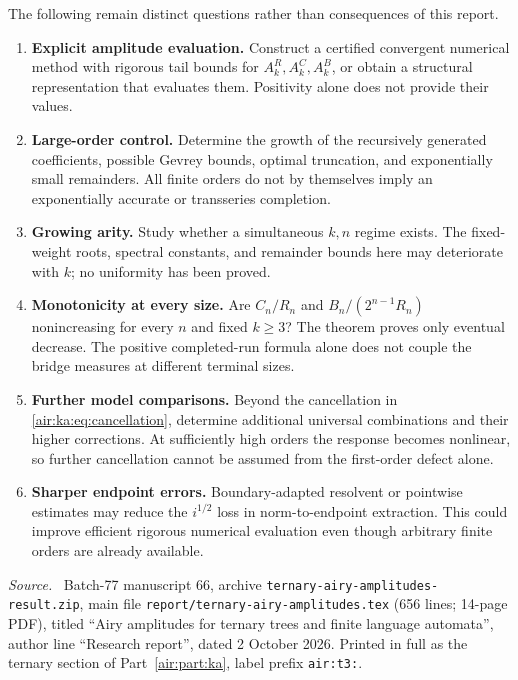 \documentclass[11pt,letterpaper]{article}
\numberwithin{equation}{section}
\theoremstyle{remark}
\newenvironment{partsource}{\par\medskip\noindent\begin{minipage}{\linewidth}\small\raggedright\textit{Source.}\ }{\end{minipage}\par\medskip}
\newcommand{\repopath}[1]{\nolinkurl{#1}}
\begin{document}
The following remain distinct questions rather than consequences of this report.
\begin{enumerate}
\item \textbf{Explicit amplitude evaluation.} Construct a certified convergent numerical method with rigorous tail bounds for $A_k^R,A_k^C,A_k^B$, or obtain a structural representation that evaluates them. Positivity alone does not provide their values.
\item \textbf{Large-order control.} Determine the growth of the recursively generated coefficients, possible Gevrey bounds, optimal truncation, and exponentially small remainders. All finite orders do not by themselves imply an exponentially accurate or transseries completion.
\item \textbf{Growing arity.} Study whether a simultaneous $k,n$ regime exists. The fixed-weight roots, spectral constants, and remainder bounds here may deteriorate with $k$; no uniformity has been proved.
\item \textbf{Monotonicity at every size.} Are $C_n/R_n$ and $B_n/(2^{n-1}R_n)$ nonincreasing for every $n$ and fixed $k\ge3$? The theorem proves only eventual decrease. The positive completed-run formula alone does not couple the bridge measures at different terminal sizes.
\item \textbf{Further model comparisons.} Beyond the cancellation in \eqref{air:ka:eq:cancellation}, determine additional universal combinations and their higher corrections. At sufficiently high orders the response becomes nonlinear, so further cancellation cannot be assumed from the first-order defect alone.
\item \textbf{Sharper endpoint errors.} Boundary-adapted resolvent or pointwise estimates may reduce the $i^{1/2}$ loss in norm-to-endpoint extraction. This could improve efficient rigorous numerical evaluation even though arbitrary finite orders are already available.
\end{enumerate}

\bigskip{}\par\nopagebreak
\begin{partsource}
Batch-77 manuscript 66, archive \repopath{ternary-airy-amplitudes-result.zip}, main file \repopath{report/ternary-airy-amplitudes.tex} (656 lines; 14-page PDF), titled ``Airy amplitudes for ternary trees and finite language automata'', author line ``Research report'', dated 2 October 2026. Printed in full as the ternary section of Part~\ref{air:part:ka}, label prefix \texttt{air:t3:}.
\end{partsource}
\end{document}
